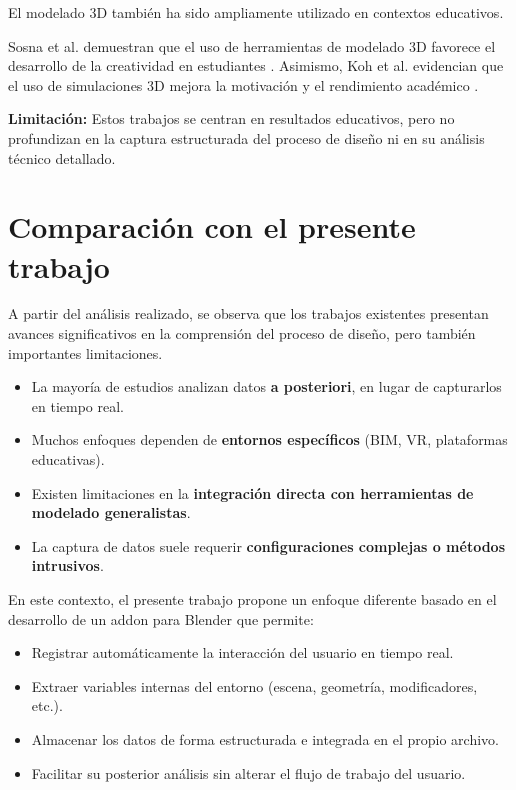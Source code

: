 El modelado 3D también ha sido ampliamente utilizado en contextos educativos.

Sosna et al. demuestran que el uso de herramientas de modelado 3D favorece el desarrollo de la creatividad en estudiantes \cite{sosna2025}. Asimismo, Koh et al. evidencian que el uso de simulaciones 3D mejora la motivación y el rendimiento académico \cite{koh2010}.

\textbf{Limitación:} Estos trabajos se centran en resultados educativos, pero no profundizan en la captura estructurada del proceso de diseño ni en su análisis técnico detallado.

\section{Comparación con el presente trabajo}

A partir del análisis realizado, se observa que los trabajos existentes presentan avances significativos en la comprensión del proceso de diseño, pero también importantes limitaciones.

\begin{itemize}
    \item La mayoría de estudios analizan datos \textbf{a posteriori}, en lugar de capturarlos en tiempo real.
    \item Muchos enfoques dependen de \textbf{entornos específicos} (BIM, VR, plataformas educativas).
    \item Existen limitaciones en la \textbf{integración directa con herramientas de modelado generalistas}.
    \item La captura de datos suele requerir \textbf{configuraciones complejas o métodos intrusivos}.
\end{itemize}

En este contexto, el presente trabajo propone un enfoque diferente basado en el desarrollo de un addon para Blender que permite:

\begin{itemize}
    \item Registrar automáticamente la interacción del usuario en tiempo real.
    \item Extraer variables internas del entorno (escena, geometría, modificadores, etc.).
    \item Almacenar los datos de forma estructurada e integrada en el propio archivo.
    \item Facilitar su posterior análisis sin alterar el flujo de trabajo del usuario.
\end{itemize}


